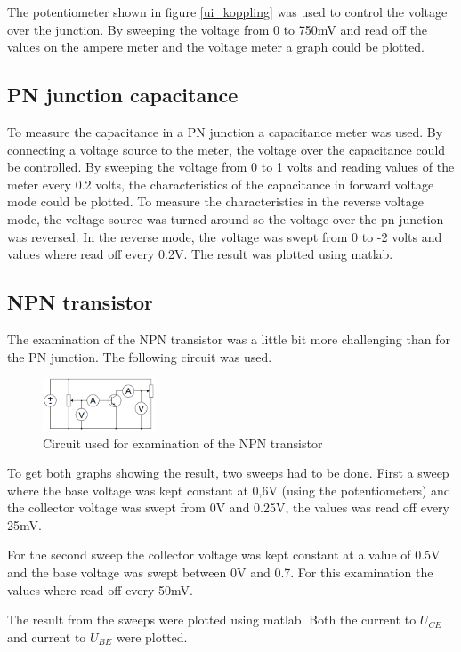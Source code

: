 \documentclass[a4paper]{article}
\begin{document}
The potentiometer shown in figure \ref{ui_koppling} was used to control the voltage over the junction. By sweeping the voltage from 0 to 750mV and read off the values on the ampere meter and the voltage meter a graph could be plotted.

\subsection{PN junction capacitance}
To measure the capacitance in a PN junction a capacitance meter was used. By connecting a voltage source to the meter, the voltage over the capacitance could be controlled. By sweeping the voltage from 0 to 1 volts and reading values of the meter every 0.2 volts, the characteristics of the capacitance in forward voltage mode could be plotted. To measure the characteristics in the reverse voltage mode, the voltage source was turned around so the voltage over the pn junction was reversed. In the reverse mode, the voltage was swept from 0 to -2 volts and values where read off every 0.2V. The result was plotted using matlab.

\subsection{NPN transistor}
The examination of the NPN transistor was a little bit more challenging than for the PN junction. The following circuit was used.

\begin{figure}[H]
	\centering
	\includegraphics[width=0.3\textwidth]{npn_circuit.png}
	\caption{Circuit used for examination of the NPN transistor}
	\label{npn_koppling}
\end{figure}
To get both graphs showing the result, two sweeps had to be done. First a sweep where the base voltage was kept constant at 0,6V (using the potentiometers) and the collector voltage was swept from 0V and 0.25V, the values was read off every 25mV.

For the second sweep the collector voltage was kept constant at a value of 0.5V and the base voltage was swept between 0V and 0.7. For this examination the values where read off every 50mV.

The result from the sweeps were plotted using matlab. Both the current to $U_{CE}$ and current to $U_{BE}$ were plotted.
\end{document}
